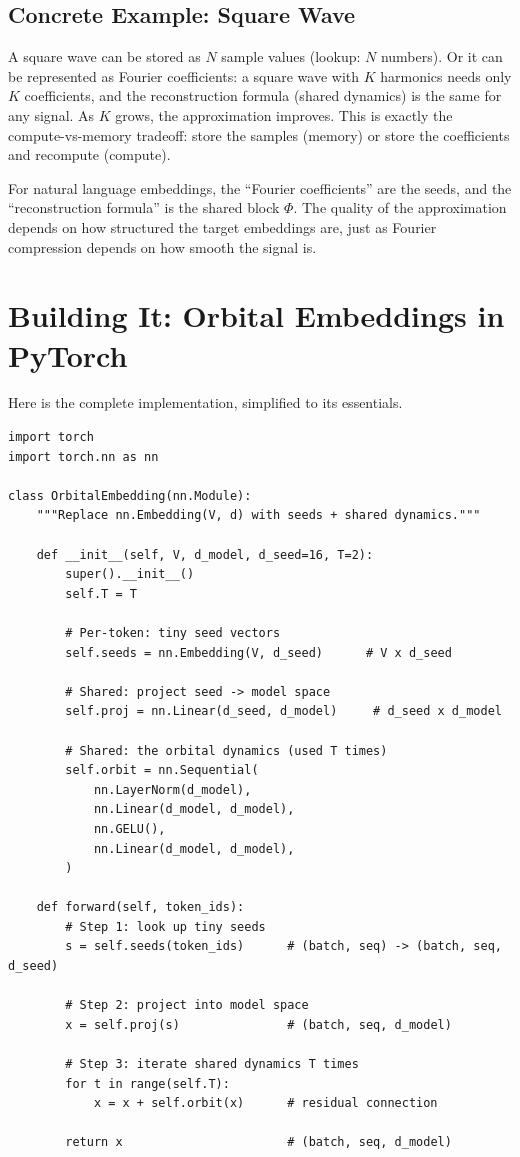 \documentclass[11pt, a4paper]{article}
\theoremstyle{remark}
\begin{document}
\subsection{Concrete Example: Square Wave}

A square wave can be stored as $N$ sample values (lookup: $N$ numbers).
Or it can be represented as Fourier coefficients: a square wave with $K$ harmonics needs only $K$ coefficients, and the reconstruction formula (shared dynamics) is the same for any signal.
As $K$ grows, the approximation improves.
This is exactly the compute-vs-memory tradeoff: store the samples (memory) or store the coefficients and recompute (compute).

For natural language embeddings, the ``Fourier coefficients'' are the seeds, and the ``reconstruction formula'' is the shared block $\Phi$.
The quality of the approximation depends on how structured the target embeddings are, just as Fourier compression depends on how smooth the signal is.


\section{Building It: Orbital Embeddings in PyTorch}
\label{sec:code}

Here is the complete implementation, simplified to its essentials.

\begin{lstlisting}[caption={Orbital embedding: the complete module.}]
import torch
import torch.nn as nn

class OrbitalEmbedding(nn.Module):
    """Replace nn.Embedding(V, d) with seeds + shared dynamics."""

    def __init__(self, V, d_model, d_seed=16, T=2):
        super().__init__()
        self.T = T

        # Per-token: tiny seed vectors
        self.seeds = nn.Embedding(V, d_seed)      # V x d_seed

        # Shared: project seed -> model space
        self.proj = nn.Linear(d_seed, d_model)     # d_seed x d_model

        # Shared: the orbital dynamics (used T times)
        self.orbit = nn.Sequential(
            nn.LayerNorm(d_model),
            nn.Linear(d_model, d_model),
            nn.GELU(),
            nn.Linear(d_model, d_model),
        )

    def forward(self, token_ids):
        # Step 1: look up tiny seeds
        s = self.seeds(token_ids)      # (batch, seq) -> (batch, seq, d_seed)

        # Step 2: project into model space
        x = self.proj(s)               # (batch, seq, d_model)

        # Step 3: iterate shared dynamics T times
        for t in range(self.T):
            x = x + self.orbit(x)      # residual connection

        return x                       # (batch, seq, d_model)
\end{lstlisting}
\end{document}

